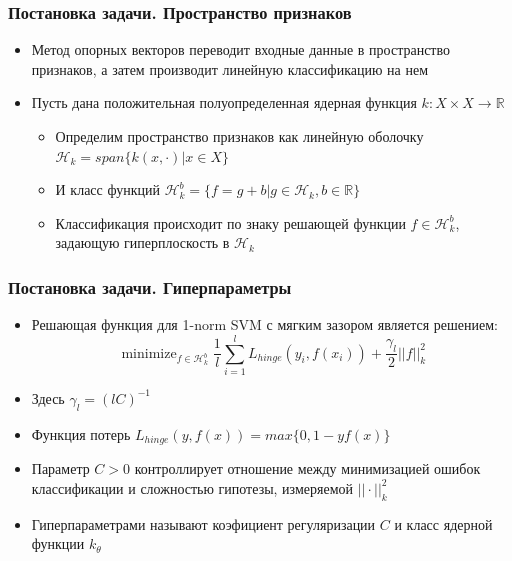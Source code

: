 \documentclass{beamer}
\begin{document}
\begin{frame}
	\frametitle{Постановка задачи. Пространство признаков}
	\begin{itemize}
		\item Метод опорных векторов переводит входные данные в пространство
		      признаков, а затем производит линейную классификацию на нем
		\item Пусть дана положительная полуопределенная ядерная функция $k : X \times X
			      \rightarrow \mathbb{R}$
		      \begin{itemize}
			      \item Определим пространство признаков как линейную оболочку
			            $\mathcal{H}_k = span\{k(x, \cdot) | x \in X\}$
			      \item И класс функций $\mathcal{H}_k^{b} = \{ f = g + b | g \in
				            \mathcal{H}_k, b \in \mathbb{R} \} $
			      \item Классификация происходит по знаку решающей функции $f
				            \in \mathcal{H}_k^{b}$, задающую гиперплоскость в
			            $\mathcal{H}_k$
		      \end{itemize}
	\end{itemize}
\end{frame}

\begin{frame}
	\frametitle{Постановка задачи. Гиперпараметры}
	\begin{itemize}
		\item Решающая функция для 1-norm SVM с мягким зазором является
		      решением:
		      \vspace{-15pt}
		      \begin{equation*}
			      \mathop{minimize}_{f \in \mathcal{H}_k^b} \frac{1}{l} \sum_{i=1}^{l} L_{hinge}(y_i, f(x_i)) + \frac{\gamma_l}{2} ||f||_k^2
		      \end{equation*}
		\item Здесь $\gamma_l = (lC)^{-1}$
		\item Функция потерь $L_{hinge}(y, f(x)) = max\{0, 1 - yf(x)\}$
		\item Параметр $C > 0$ контроллирует отношение между минимизацией ошибок
		      классификации и сложностью
		      гипотезы, измеряемой $||\cdot||_k^2$
		\item Гиперпараметрами называют коэфициент регуляризации $C$ и класс
		      ядерной функции $k_\theta$
	\end{itemize}
\end{frame}
\end{document}
